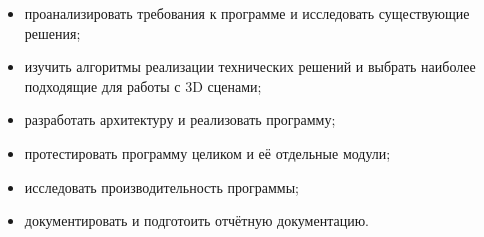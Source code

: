 \begin{itemize}[label=---]
    \item проанализировать требования к программе и исследовать существующие решения;
    
    \item изучить алгоритмы реализации технических решений и выбрать наиболее подходящие для работы с 3D сценами;
    
    \item разработать архитектуру и реализовать программу;
    
    \item протестировать программу целиком и её отдельные модули;
    
    \item исследовать производительность программы;
    
    \item документировать и подготоить отчётную документацию.
\end{itemize}

\newpage